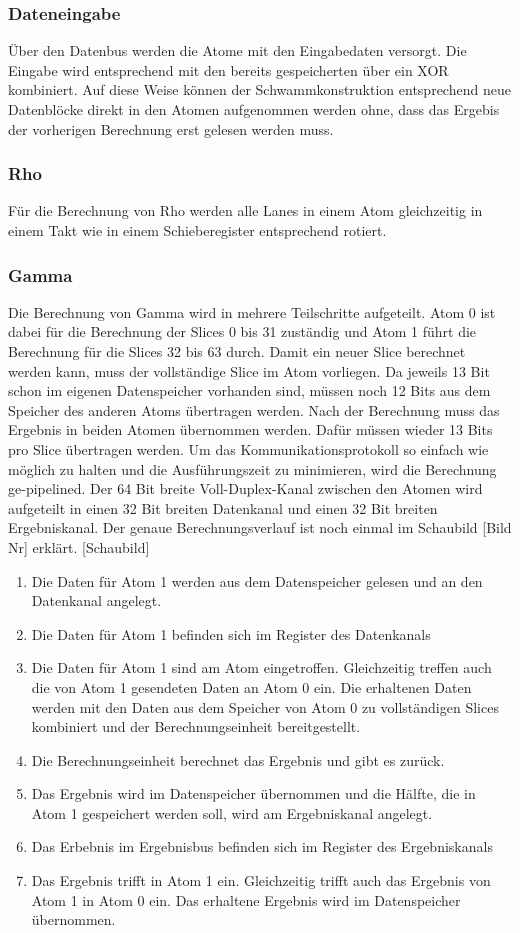 \subsubsection{Dateneingabe}
Über den Datenbus werden die Atome mit den Eingabedaten versorgt. Die Eingabe wird entsprechend mit den bereits gespeicherten über ein XOR kombiniert.
Auf diese Weise können der Schwammkonstruktion entsprechend neue Datenblöcke direkt in den Atomen aufgenommen werden ohne,
dass das Ergebis der vorherigen Berechnung erst gelesen werden muss.
\subsubsection{Rho}
Für die Berechnung von Rho werden alle Lanes in einem Atom gleichzeitig in einem Takt wie in einem Schieberegister entsprechend rotiert.
\subsubsection{Gamma}
Die Berechnung von Gamma wird in mehrere Teilschritte aufgeteilt. Atom 0 ist dabei für die Berechnung der Slices 0 bis 31 zuständig und Atom 1
führt die Berechnung für die Slices 32 bis 63 durch. Damit ein neuer Slice berechnet werden kann, muss der vollständige Slice im Atom vorliegen.
Da jeweils 13 Bit schon im eigenen Datenspeicher vorhanden sind, müssen noch 12 Bits aus dem Speicher des anderen Atoms übertragen werden.
Nach der Berechnung muss das Ergebnis in beiden Atomen übernommen werden. Dafür müssen wieder 13 Bits pro Slice übertragen werden.
Um das Kommunikationsprotokoll so einfach wie möglich zu halten und die Ausführungszeit zu minimieren, wird die Berechnung ge-pipelined.
Der 64 Bit breite Voll-Duplex-Kanal zwischen den Atomen wird aufgeteilt in einen 32 Bit breiten Datenkanal und einen 32 Bit breiten Ergebniskanal.
Der genaue Berechnungsverlauf ist noch einmal im Schaubild [Bild Nr] erklärt.
[Schaubild]
\begin{enumerate}
\item Die Daten für Atom 1 werden aus dem Datenspeicher gelesen und an den Datenkanal angelegt.
\item Die Daten für Atom 1 befinden sich im Register des Datenkanals
\item Die Daten für Atom 1 sind am Atom eingetroffen. Gleichzeitig treffen auch die von Atom 1 gesendeten Daten an Atom 0 ein.
Die erhaltenen Daten werden mit den Daten aus dem Speicher von Atom 0 zu vollständigen Slices kombiniert und der Berechnungseinheit bereitgestellt.
\item Die Berechnungseinheit berechnet das Ergebnis und gibt es zurück.
\item Das Ergebnis wird im Datenspeicher übernommen und die Hälfte, die in Atom 1 gespeichert werden soll, wird am Ergebniskanal angelegt.
\item Das Erbebnis im Ergebnisbus befinden sich im Register des Ergebniskanals
\item Das Ergebnis trifft in Atom 1 ein. Gleichzeitig trifft auch das Ergebnis von Atom 1 in Atom 0 ein.
Das erhaltene Ergebnis wird im Datenspeicher übernommen.
\end{enumerate}
